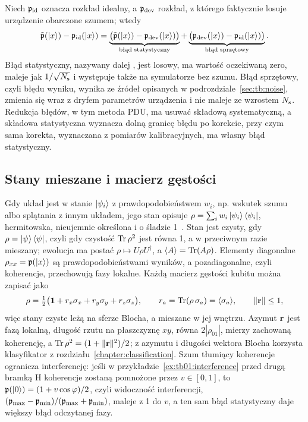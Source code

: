 Niech $\mathfrak{p}_{\mathrm{id}}$ oznacza rozkład idealny, a $\mathfrak{p}_{\mathrm{dev}}$ rozkład, z którego faktycznie losuje urządzenie obarczone szumem; wtedy
\begin{equation}\label{eq:tb01:errordecomp}
  \tilde{\mathfrak{p}}(\ket{x})-\mathfrak{p}_{\mathrm{id}}(\ket{x})
  =\underbrace{\bigl(\tilde{\mathfrak{p}}(\ket{x})-\mathfrak{p}_{\mathrm{dev}}(\ket{x})\bigr)}_{\text{błąd statystyczny}}
  +\underbrace{\bigl(\mathfrak{p}_{\mathrm{dev}}(\ket{x})-\mathfrak{p}_{\mathrm{id}}(\ket{x})\bigr)}_{\text{błąd sprzętowy}}.
\end{equation}
Błąd statystyczny, nazywany dalej , jest losowy, ma wartość oczekiwaną zero, maleje jak $1/\sqrt{N_{\mathrm{s}}}$ i występuje także na symulatorze bez szumu.
Błąd sprzętowy, czyli  błędu wyniku, wynika ze źródeł opisanych w podrozdziale~\ref{sec:tb:noise}, zmienia się wraz z dryfem parametrów urządzenia i nie maleje ze wzrostem $N_{\mathrm{s}}$.
Redukcja błędów, w tym metoda PDU, ma usuwać składową systematyczną, a składowa statystyczna wyznacza dolną granicę błędu po korekcie, przy czym sama korekta, wyznaczana z pomiarów kalibracyjnych, ma własny błąd statystyczny.

\subsection{Stany mieszane i macierz gęstości}\label{subsec:tb:density}

Gdy układ jest w stanie $\ket{\psi_i}$ z prawdopodobieństwem $w_i$, np. wskutek szumu albo splątania z innym układem, jego stan opisuje  $\rho=\sum_i w_i\ket{\psi_i}\bra{\psi_i}$, hermitowska, nieujemnie określona i o śladzie 1~\cite{NielsenChuang2010,bib:density_matrix_art}.
Stan jest czysty, gdy $\rho=\ket{\psi}\bra{\psi}$, czyli gdy czystość $\operatorname{Tr}\rho^2$ jest równa 1, a w przeciwnym razie mieszany; ewolucja ma postać $\rho\mapsto U\rho U^\dagger$, a $\langle A\rangle=\operatorname{Tr}(A\rho)$.
Elementy diagonalne $\rho_{xx}=\mathfrak{p}(\ket{x})$ są prawdopodobieństwami wyników, a pozadiagonalne, czyli koherencje, przechowują fazy lokalne.
Każdą macierz gęstości kubitu można zapisać jako
\begin{equation}\label{eq:tb01:blochrho}
  \rho=\tfrac{1}{2}\bigl(\mathbf{1}+r_x\sigma_x+r_y\sigma_y+r_z\sigma_z\bigr),\qquad r_a=\operatorname{Tr}(\rho\,\sigma_a)=\langle\sigma_a\rangle,\qquad \|\mathbf{r}\|\le1,
\end{equation}
więc stany czyste leżą na sferze Blocha, a mieszane w jej wnętrzu.
Azymut $\mathbf{r}$ jest fazą lokalną, długość rzutu na płaszczyznę $xy$, równa $2|\rho_{01}|$, mierzy zachowaną koherencję, a $\operatorname{Tr}\rho^2=(1+\|\mathbf{r}\|^2)/2$; z azymutu i długości wektora Blocha korzysta klasyfikator z rozdziału~\ref{chapter:classification}.
Szum tłumiący koherencje ogranicza interferencję: jeśli w przykładzie~\ref{ex:tb01:interference} przed drugą bramką $\mathrm{H}$ koherencje zostaną pomnożone przez $v\in[0,1]$, to $\mathfrak{p}(\ket{0})=(1+v\cos\varphi)/2$, czyli widoczność interferencji, $(\mathfrak{p}_{\max}-\mathfrak{p}_{\min})/(\mathfrak{p}_{\max}+\mathfrak{p}_{\min})$, maleje z 1 do $v$, a ten sam błąd statystyczny daje większy błąd odczytanej fazy.

